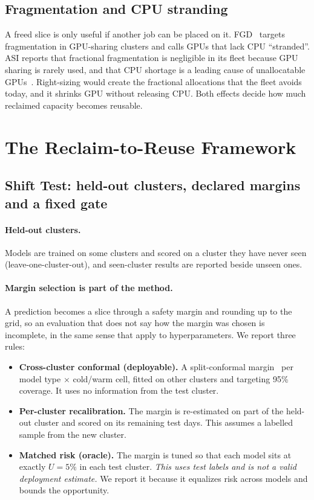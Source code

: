 \documentclass[10pt]{article}
\begin{document}
\subsection{Fragmentation and CPU stranding}
\label{sec:bg-frag}

A freed slice is only useful if another job can be placed on it. FGD~\citep{weng2023fgd} targets fragmentation in GPU-sharing clusters and calls GPUs that lack CPU ``stranded''. ASI reports that fractional fragmentation is negligible in its fleet because GPU sharing is rarely used, and that CPU shortage is a leading cause of unallocatable GPUs~\citep{li2026asi}. Right-sizing would create the fractional allocations that the fleet avoids today, and it shrinks GPU without releasing CPU. Both effects decide how much reclaimed capacity becomes reusable.

\section{The Reclaim-to-Reuse Framework}
\label{sec:framework}

\subsection{Shift Test: held-out clusters, declared margins and a fixed gate}
\label{sec:protocol}

\paragraph{Held-out clusters.} Models are trained on some clusters and scored on a cluster they have never seen (leave-one-cluster-out), and seen-cluster results are reported beside unseen ones.

\paragraph{Margin selection is part of the method.} A prediction becomes a slice through a safety margin and rounding up to the grid, so an evaluation that does not say how the margin was chosen is incomplete, in the same sense that \citet{gulrajani2021search} apply to hyperparameters. We report three rules:
\begin{itemize}
  \item \textbf{Cross-cluster conformal (deployable).} A split-conformal margin~\citep{romano2019cqr,angelopoulos2021gentle} per model type $\times$ cold/warm cell, fitted on other clusters and targeting 95\% coverage. It uses no information from the test cluster.
  \item \textbf{Per-cluster recalibration.} The margin is re-estimated on part of the held-out cluster and scored on its remaining test days. This assumes a labelled sample from the new cluster.
  \item \textbf{Matched risk (oracle).} The margin is tuned so that each model sits at exactly $U = 5\%$ in each test cluster. \emph{This uses test labels and is not a valid deployment estimate.} We report it because it equalizes risk across models and bounds the opportunity.
\end{itemize}
\end{document}
